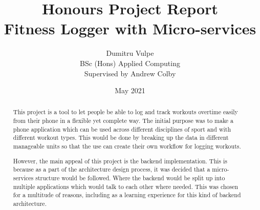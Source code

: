 \documentclass{article}
\title{Honours Project Report\\Fitness Logger with Micro-services}
\author{Dumitru Vulpe\\BSc (Hons) Applied Computing\\Supervised by Andrew Colby}
\date{May 2021}
\begin{document}
\maketitle

\vspace*{\fill/2}
\begin{abstract} 

This project is a tool to let people be able to log and track workouts overtime easily from their phone in a flexible yet complete way. The initial purpose was to make a phone application which can be used across different disciplines of sport and with different workout types. This would be done by breaking up the data in different manageable units so that the use can create their own workflow for logging workouts.

However, the main appeal of this project is the backend implementation. This is because as a part of the architecture design process, it was decided that a micro-services structure would be followed. Where the backend would be split up into multiple applications which would talk to each other where needed. This was chosen for a multitude of reasons, including as a learning experience for this kind of backend architecture.

\end{abstract}
\vspace*{\fill}

\newpage
\tableofcontents 
\newpage
\end{document}
